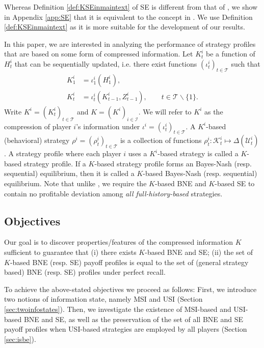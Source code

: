 \documentclass[pdflatex,sn-basic]{sn-jnl}
\newcommand{\Comp}{K}
\newcommand{\Compset}{\mathcal{K}}
\theoremstyle{thmstyleone}%
\theoremstyle{thmstyletwo}%
\theoremstyle{thmstylethree}%
\begin{document}
{Whereas Definition \ref{def:KSEinmaintext} of SE is different from that of \cite{kreps1982sequential}, we show in Appendix \ref{app:SE} that it is equivalent to the concept in \cite{kreps1982sequential}. We use Definition \ref{def:KSEinmaintext} as it is more suitable for the development of our results.}

In this paper, we are interested in analyzing the performance of strategy profiles that are based on some form of compressed information.
Let $\Comp_t^i$ be a function of $H_t^i$ that can be sequentially updated, i.e. there exist functions $(\iota_t^i)_{t\in\mathcal{T}}$ such that
	\begin{align}
		\Comp_1^i &= \iota_1^i(H_1^i),\\
		\Comp_{t}^i &= \iota_{t}^i(\Comp_{t-1}^i, Z_{t-1}^i),\qquad t\in\mathcal{T}\backslash\{1\}.
	\end{align}
Write $\Comp^i=(\Comp_t^i)_{t\in\mathcal{T}}$ and $\Comp=(\Comp^i)_{i\in\mathcal{I}}$. We will refer to $\Comp^i$ as the compression of player $i$'s information under $\iota^i = (\iota_t^i)_{t\in\mathcal{T}}$. A $\Comp^i$-based (behavioral) strategy $\rho^i=(\rho_t^i)_{t\in\mathcal{T}}$ is a collection of functions $\rho_t^i\colon\Compset_t^i\mapsto \Delta(\mathcal{U}_t^i)$. A strategy profile where each player $i$ uses a $\Comp^i$-based strategy is called a $\Comp$-based strategy profile. If a $\Comp$-based strategy profile forms an Bayes-Nash (resp. sequential) equilibrium, then it is called a $\Comp$-based Bayes-Nash (resp. sequential) equilibrium. Note that unlike \cite{piccione1997interpretation,battigalli1997dynamic,GROVE199751,HALPERN199766,AUMANN1997102}, we require the $\Comp$-based BNE and $\Comp$-based SE to contain no profitable deviation among \emph{all full-history-based} strategies.

\subsection{Objectives}
Our goal is to discover properties/features of the compressed information $\Comp$ sufficient to guarantee that (i) there exists $\Comp$-based BNE and SE; (ii) the set of $\Comp$-based BNE (resp. SE) payoff profiles is equal to the set of (general strategy based) BNE (resp. SE) profiles under perfect recall. 

To achieve the above-stated objectives we proceed as follows: First, we introduce two notions of information state, namely MSI and USI (Section \ref{sec:twoinfostates}). Then, we investigate the existence of MSI-based and USI-based BNE and SE, as well as the preservation of the set of all BNE and SE payoff profiles when USI-based strategies are employed by all players (Section \ref{sec:isbe}).
\end{document}
